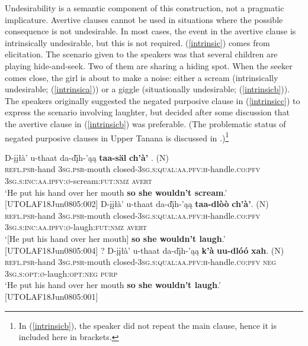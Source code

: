 \documentclass[output=paper,colorlinks,citecolor=brown
]{langscibook}
\begin{document}
Undesirability is a semantic component of this construction, not a pragmatic implicature. Avertive clauses cannot be used in situations where the possible consequence is not undesirable. In most cases, the event in the avertive clause is intrinsically undesirable, but this is not required. (\ref{intrinsic}) comes from elicitation. The scenario given to the speakers was that several children are playing hide-and-seek. Two of them are sharing a hiding spot. When the seeker comes close, the girl is about to make a noise: either a scream (intrinsically undesirable; (\ref{intrinsica})) or a giggle (situationally undesirable; (\ref{intrinsicb})). The speakers originally suggested the negated purposive clause in (\ref{intrinsicc}) to express the scenario involving laughter, but decided after some discussion that the avertive clause in (\ref{intrinsicb}) was preferable. (The problematic status of negated purposive clauses in Upper Tanana is discussed in .)\footnote{In (\ref{intrinsicb}), the speaker did not repeat the main clause, hence it is included here in brackets.}

\begin{exe}
\ex \label{intrinsic}
\begin{xlista}
\ex \label{intrinsica}
\gll D-įįłà' u-thaat da-dį̀h-'ąą \textbf{taa-säl} {\textbf{ch'à'} . \textnormal{(N)}} \\
\textsc{refl.psr}-hand \textsc{3sg.psr}-mouth closed-\textsc{3sg.s:qual:aa.pfv:h}-handle.\textsc{co:pfv} \textsc{3sg.s:inc:aa.ipfv:ø}-scream:\textsc{fut:nmz} \textsc{avert} \\
\glt `He put his hand over her mouth \textbf{so she wouldn't scream}.' \\ \hfill [UTOLAF18Jun0805:002]
\ex \label{intrinsicb}
\gll {\ob}D-įįłà' u-thaat da-dį̀h-'ąą{\cb} \textbf{taa-dlòò} {\textbf{ch'à'}. \textnormal{(N)}}\\
\textsc{refl.psr}-hand \textsc{3sg.psr}-mouth closed-\textsc{3sg.s:qual:aa.pfv:h}-handle.\textsc{co:pfv} \textsc{3sg.s:inc:aa.ipfv:ø}-laugh:\textsc{fut:nmz} \textsc{avert} \\
\glt `[He put his hand over her mouth] \textbf{so she wouldn't laugh}.' \\ \hfill [UTOLAF18Jun0805:004]
\ex \label{intrinsicc}
\gll ? D-įįłà' u-thaat da-dį̀h-'ąą \textbf{k'à} \textbf{uu-dlóó} {\textbf{xah}. \textnormal{(N)}}\\
{} \textsc{refl.psr}-hand \textsc{3sg.psr}-mouth closed-\textsc{3sg.s:qual:aa.pfv:h}-handle.\textsc{co:pfv} \textsc{neg} \textsc{3sg.s:opt:ø}-laugh:\textsc{opt:neg} \textsc{purp} \\
\glt `He put his hand over her mouth \textbf{so she wouldn't laugh}.' \\ \hfill [UTOLAF18Jun0805:001]
\end{xlista}
\end{exe}
\end{document}
